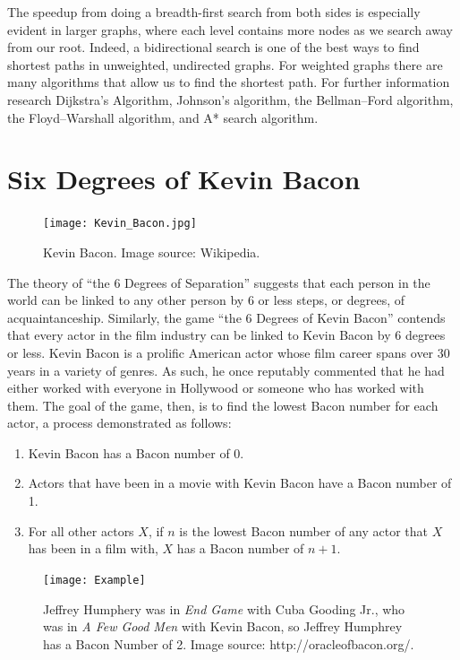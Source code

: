 The speedup from doing a breadth-first search from both sides is especially evident in larger graphs, where each level
contains more nodes as we search away from our root. Indeed, a bidirectional search is one of the best ways to find shortest
paths in unweighted, undirected graphs. For weighted graphs there are many algorithms
that allow us to find the shortest path. For further information research Dijkstra's Algorithm, Johnson's algorithm, the Bellman--Ford algorithm, the Floyd--Warshall algorithm, and A* search algorithm.

\section*{Six Degrees of Kevin Bacon}
\begin{figure}[h]
\texttt{[image: Kevin\_Bacon.jpg]}
\caption{Kevin Bacon.  Image source: Wikipedia.}
\end{figure}

The theory of ``the 6 Degrees of Separation'' suggests that each person in the world can be linked to any other person by 6 or less steps, or degrees, of acquaintanceship.
Similarly, the game ``the 6 Degrees of Kevin Bacon'' contends that every actor in the film industry can be linked to Kevin Bacon by 6 degrees or less. Kevin Bacon
is a prolific American actor whose film career spans over 30 years in a variety of genres. As such, he once reputably commented that he had either worked with everyone in
Hollywood or someone who has worked with them. The goal of the game, then, is to find the lowest Bacon number for each actor, a process demonstrated as follows:
\begin{enumerate}
\item Kevin Bacon has a Bacon number of 0.
\item Actors that have been in a movie with Kevin Bacon have a Bacon number of 1.
\item For all other actors $X$, if $n$ is the lowest Bacon number of any actor that $X$ has been in a film with, $X$ has a Bacon number of $n+1$.
\end{enumerate}

\begin{figure}[h]
\texttt{[image: Example]}
\caption{Jeffrey Humphery was in \emph{End Game} with Cuba Gooding Jr., who was in \emph{A Few Good Men} with Kevin Bacon, so Jeffrey Humphrey has a Bacon Number of 2.  Image source: http://oracleofbacon.org/.}
\end{figure}

